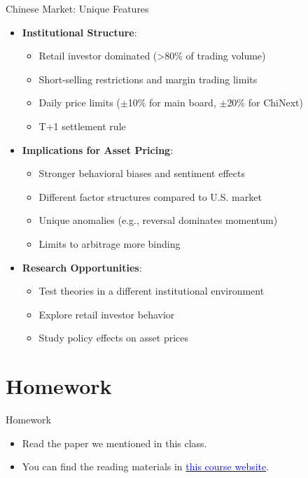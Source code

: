 \documentclass{beamer}
\begin{document}
\begin{frame}{Chinese Market: Unique Features}
	\begin{itemize}
		\item \textbf{Institutional Structure}:
		\begin{itemize}
			\item Retail investor dominated (>80\% of trading volume)
			\item Short-selling restrictions and margin trading limits
			\item Daily price limits ($\pm$10\% for main board, $\pm$20\% for ChiNext)
			\item T+1 settlement rule
		\end{itemize}
		\item \textbf{Implications for Asset Pricing}:
		\begin{itemize}
			\item Stronger behavioral biases and sentiment effects
			\item Different factor structures compared to U.S. market
			\item Unique anomalies (e.g., reversal dominates momentum)
			\item Limits to arbitrage more binding
		\end{itemize}
		\item \textbf{Research Opportunities}:
		\begin{itemize}
			\item Test theories in a different institutional environment
			\item Explore retail investor behavior
			\item Study policy effects on asset prices
		\end{itemize}
	\end{itemize}
\end{frame}


\section{Homework}

\begin{frame}{Homework}
	\begin{itemize}
		\item Read the paper we mentioned in this class.
		\item You can find the reading materials in \href{https://betalpha.notion.site/Asset-Pricing-2025-Syllabus-c21bce013fb64ee18013882de43b7f73?pvs=4}{\textcolor{blue}{this course website}}.
	\end{itemize}

\end{frame}
\end{document}
